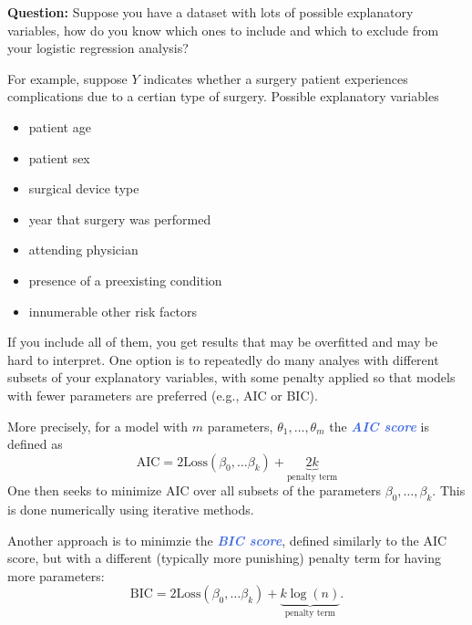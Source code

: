 \documentclass[10pt]{article}
\theoremstyle{definition}
\newcommand{\vt}{\vskip 5mm} %
\newcommand{\Fl}{\vt\noindent\textbf} %
\newcommand{\1}[1]{\textbf{1}_{\left[#1\right]}} %
\newcommand{\demph}[1]{\textcolor{RoyalBlue}{\textbf{\slshape #1}}} %
\begin{document}
\Fl{Question:} Suppose you have a dataset with lots of possible explanatory
variables, how do you know which ones to include and which to exclude from
your logistic regression analysis?

For example, suppose $Y$ indicates whether a surgery patient experiences
complications due to a certian type of surgery. Possible explanatory variables
\begin{itemize}
  \item patient age
  \item patient sex
  \item surgical device type 
  \item year that surgery was performed
  \item attending physician
  \item presence of a preexisting condition
  \item innumerable other risk factors
\end{itemize}
If you include all of them, you get results that may be overfitted and may be
hard to interpret. One option is to repeatedly do many analyes with different
subsets of your explanatory variables, with some penalty applied so that
models with fewer parameters are preferred (e.g., AIC or BIC).

More precisely, for a model with $m$ parameters,
$\theta_{1},\ldots,\theta_{m}$ the \demph{AIC score} is defined as
\begin{equation*}
  \mathrm{AIC} = 2 \text{Loss}(\beta_{0},\ldots\beta_{k}) + \underbrace{2k}_{\text{penalty term}}
\end{equation*}
One then seeks to minimize $\textrm{AIC}$ over all subsets of the parameters
$\beta_{0},\ldots,\beta_{k}$. This is done numerically using iterative
methods.

Another approach is to minimzie the \demph{BIC score}, defined similarly to
the AIC score, but with a different (typically more punishing) penalty term
for having more parameters:
\begin{equation*}
  \mathrm{BIC} = 2 \text{Loss}(\beta_{0},\ldots\beta_{k}) + \underbrace{k\log(n)}_{\text{penalty term}}.
\end{equation*}
\end{document}
